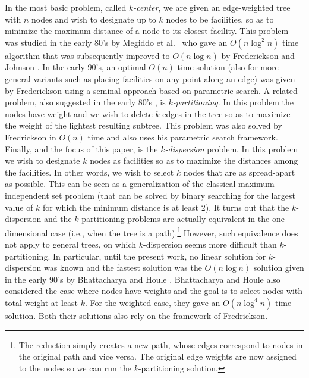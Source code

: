 \documentclass[11pt,a4paper]{article}
\newcommand{\Oh}{{O}}
\theoremstyle{definition}
\theoremstyle{remark}
\begin{document}
In the most basic problem, called \emph{$k$-center}, we are given an edge-weighted tree with $n$ nodes and wish to designate up to $k$ nodes to be facilities, so as to minimize the maximum distance of a node to its closest facility. This problem was studied in the early 80's by Megiddo et al.~\cite{Megiddo1981} who gave an $\Oh(n\log^2n)$ time algorithm that was subsequently improved to $\Oh(n\log n)$ by Frederickson and Johnson \cite{Frederickson1983}. In the early 90's, an optimal $\Oh(n)$ time solution (also for more general variants such as placing facilities on any point along an edge) was given by Frederickson \cite{Frederickson1991a} using a seminal approach based on parametric search. 
%
A related problem, also suggested in the early 80's  \cite{Becker1982,Perl1981}, is \emph{$k$-partitioning}. In this problem the nodes have weight and we wish to delete $k$ edges in the tree so as to maximize the weight of the lightest resulting subtree. This problem was also solved by Fredrickson in $\Oh(n)$ time \cite{Frederickson1991} and also uses his parametric search framework. 
%
Finally, and the focus of this paper, is the  {\em $k$-dispersion} problem. In this problem we wish to designate $k$ nodes as facilities so as to maximize the distances among the facilities.  In other words, we wish to select $k$ nodes that are as spread-apart as possible. This can be seen as a generalization of the classical maximum independent set problem (that can be solved by binary searching for the largest value of $k$ for which the minimum distance is at least 2).  
%
It turns out that the $k$-dispersion and the $k$-partitioning problems are actually equivalent in the one-dimensional case (i.e., when the tree is a path).\footnote{The reduction simply creates a new path, whose edges correspond to nodes in the original path and vice versa. The original edge weights are now assigned to the nodes so we can run the $k$-partitioning solution.} However, such equivalence does not apply to general trees, on which $k$-dispersion seems more difficult than $k$-partitioning. In particular, until the present work, no linear solution for $k$-dispersion was known and the fastest solution was the $O(n \log n)$ solution given in the early 90's by Bhattacharya and Houle \cite{Bhattacharya1991}. Bhattacharya and Houle also considered the case where nodes have weights and the goal is to select nodes with total weight at least $k$. For the weighted case, they gave an $\Oh(n\log^4 n)$ time solution. Both their solutions also rely on the framework of Fredrickson.
\end{document}
